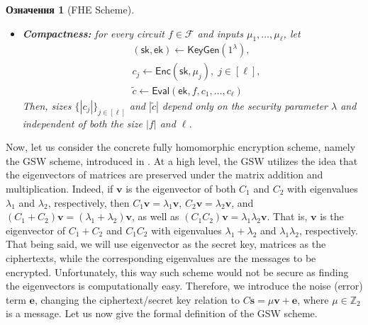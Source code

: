 \documentclass[12pt,a4paper,oneside]{book}
\theoremstyle{dplplain}
\theoremstyle{dpldefinition}
\newtheorem{definition}[theorem]{Означення}%
\theoremstyle{dplremark}
\begin{document}
\begin{definition}[FHE Scheme]
\begin{itemize}
        it holds that
        \begin{equation*}
            \left\{ (\mathsf{ek},c_0): \begin{matrix}
                (\mathsf{sk},\mathsf{ek}) \gets \mathsf{KeyGen}(1^{\lambda}) \\
                c_0 \gets \mathsf{Enc}(\mathsf{sk},\mu_0)
            \end{matrix} \right\} \approx_C \left\{ (\mathsf{ek},c_1): \begin{matrix}
                (\mathsf{sk},\mathsf{ek}) \gets \mathsf{KeyGen}(1^{\lambda}) \\
                c_0 \gets \mathsf{Enc}(\mathsf{sk},\mu_1)
            \end{matrix} \right\},
        \end{equation*}
        where $\approx_C$ means the computational indistinguishability.
        \item \textbf{Compactness:} for every circuit $f \in \mathcal{F}$ and
        inputs $\mu_1,\dots,\mu_{\ell}$, let 
        \begin{align*}
        &(\mathsf{sk},\mathsf{ek}) \gets
        \mathsf{KeyGen}(1^{\lambda}), \\
        &c_j \gets \mathsf{Enc}(\mathsf{sk},\mu_j), \; j \in [\ell], \\
        &\widetilde{c} \gets \mathsf{Eval}(\mathsf{ek},f,c_1,\dots,c_{\ell})
        \end{align*}
        Then, sizes $\{|c_j|\}_{j \in [\ell]}$ and $|\widetilde{c}|$ depend only
        on the security parameter $\lambda$ and independent of both the size
        $|f|$ and $\ell$.
    \end{itemize}
\end{definition}

Now, let us consider the concrete fully homomorphic encryption scheme, namely
the GSW scheme, introduced in \cite{gsw}. At a high level, the GSW utilizes the
idea that the eigenvectors of matrices are preserved under the matrix addition
and multiplication. Indeed, if $\mathbf{v}$ is the eigenvector of both $C_1$ and
$C_2$ with eigenvalues $\lambda_1$ and $\lambda_2$, respectively, then
$C_1\mathbf{v}=\lambda_1\mathbf{v}$, $C_2\mathbf{v}=\lambda_2\mathbf{v}$, and
$(C_1+C_2)\mathbf{v}=(\lambda_1+\lambda_2)\mathbf{v}$, as well as
$(C_1C_2)\mathbf{v}=\lambda_1\lambda_2\mathbf{v}$. That is, $\mathbf{v}$ is the
eigenvector of $C_1+C_2$ and $C_1C_2$ with eigenvalues $\lambda_1+\lambda_2$ and
$\lambda_1\lambda_2$, respectively. That being said, we will use eigenvector as
the secret key, matrices as the ciphertexts, while the corresponding eigenvalues
are the messages to be encrypted. Unfortunately, this way such scheme would not
be secure as finding the eigenvectors is computationally easy. Therefore, we
introduce the noise (error) term $\mathbf{e}$, changing the ciphertext/secret
key relation to $C\mathbf{s}=\mu\mathbf{v}+\mathbf{e}$, where $\mu \in
\mathbb{Z}_2$ is a message. Let us now give the formal definition of the GSW
scheme.
\end{document}

